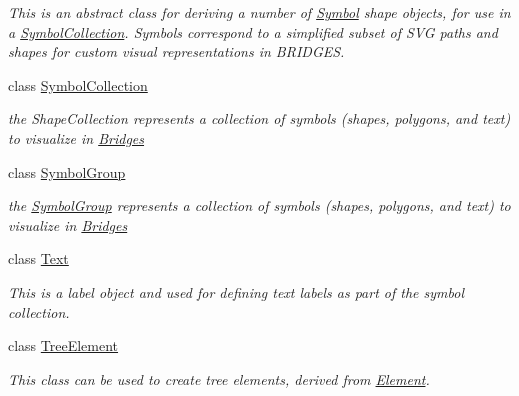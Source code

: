 \begin{DoxyCompactItemize}
\begin{DoxyCompactList}\small\item\em This is an abstract class for deriving a number of \hyperlink{classbridges_1_1datastructure_1_1_symbol}{Symbol} shape objects, for use in a \hyperlink{classbridges_1_1datastructure_1_1_symbol_collection}{Symbol\+Collection}. Symbols correspond to a simplified subset of S\+VG paths and shapes for custom visual representations in B\+R\+I\+D\+G\+ES. \end{DoxyCompactList}\item 
class \hyperlink{classbridges_1_1datastructure_1_1_symbol_collection}{Symbol\+Collection}
\begin{DoxyCompactList}\small\item\em the Shape\+Collection represents a collection of symbols (shapes, polygons, and text) to visualize in \hyperlink{classbridges_1_1_bridges}{Bridges} \end{DoxyCompactList}\item 
class \hyperlink{classbridges_1_1datastructure_1_1_symbol_group}{Symbol\+Group}
\begin{DoxyCompactList}\small\item\em the \hyperlink{classbridges_1_1datastructure_1_1_symbol_group}{Symbol\+Group} represents a collection of symbols (shapes, polygons, and text) to visualize in \hyperlink{classbridges_1_1_bridges}{Bridges} \end{DoxyCompactList}\item 
class \hyperlink{classbridges_1_1datastructure_1_1_text}{Text}
\begin{DoxyCompactList}\small\item\em This is a label object and used for defining text labels as part of the symbol collection. \end{DoxyCompactList}\item 
class \hyperlink{classbridges_1_1datastructure_1_1_tree_element}{Tree\+Element}
\begin{DoxyCompactList}\small\item\em This class can be used to create tree elements, derived from \hyperlink{classbridges_1_1datastructure_1_1_element}{Element}. \end{DoxyCompactList}\end{DoxyCompactItemize}

